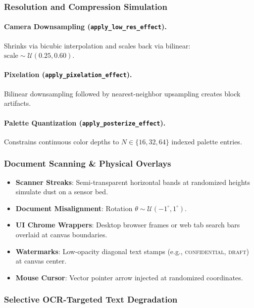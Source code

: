 \documentclass[11pt,twocolumn]{article}
\begin{document}
\subsubsection{Resolution and Compression Simulation}\label{sec:resolution}

\paragraph{Camera Downsampling (\texttt{apply\_low\_res\_effect}).} Shrinks via bicubic interpolation and scales back via bilinear: $\text{scale} \sim \mathcal{U}(0.25, 0.60)$.

\paragraph{Pixelation (\texttt{apply\_pixelation\_effect}).} Bilinear downsampling followed by nearest-neighbor upsampling creates block artifacts.

\paragraph{Palette Quantization (\texttt{apply\_posterize\_effect}).} Constrains continuous color depths to $N \in \{16, 32, 64\}$ indexed palette entries.

\subsubsection{Document Scanning \& Physical Overlays}\label{sec:scanning}

\begin{itemize}[nosep]
  \item \textbf{Scanner Streaks}: Semi-transparent horizontal bands at randomized heights simulate dust on a sensor bed.
  \item \textbf{Document Misalignment}: Rotation $\theta \sim \mathcal{U}(-1^\circ, 1^\circ)$.
  \item \textbf{UI Chrome Wrappers}: Desktop browser frames or web tab search bars overlaid at canvas boundaries.
  \item \textbf{Watermarks}: Low-opacity diagonal text stamps (e.g., \textsc{confidential}, \textsc{draft}) at canvas center.
  \item \textbf{Mouse Cursor}: Vector pointer arrow injected at randomized coordinates.
\end{itemize}

\subsubsection{Selective OCR-Targeted Text Degradation}\label{sec:text_degrad}
\end{document}
